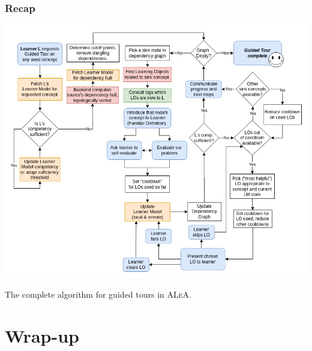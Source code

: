 \documentclass[aspectratio=169, usenames, dvipsnames]{beamer}
\def\ALeA{\textsc{ALeA}\xspace}
\begin{document}
\begin{frame}
\frametitle{Recap}
\begin{minipage}{0.7\textwidth}
\vspace*{-10px}
\includegraphics[height=0.9\textheight,keepaspectratio]{images/gt_algorithm_square}
\end{minipage}%
\begin{minipage}{0.3\textwidth}
The complete algorithm for guided tours in \ALeA.
\end{minipage}%
\end{frame}

\section{Wrap-up}
\end{document}
